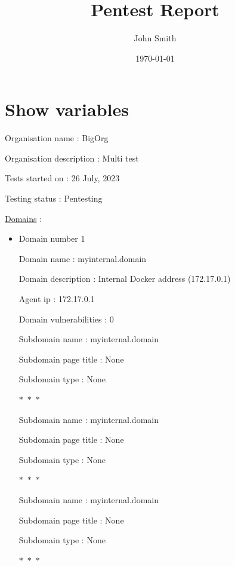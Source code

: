 \documentclass[a4paper,11pt]{book}
\title{Pentest Report} %
\author{John Smith} %
\date{\today} %
\begin{document}
 
\maketitle %

\section{Show variables}

Organisation name : BigOrg

Organisation description : Multi test

Tests started on : 26 July, 2023\

Testing status : Pentesting

\underline{Domains} :

\begin{itemize}
    \item Domain number 1

    Domain name : myinternal.domain

    Domain description : Internal Docker address (172.17.0.1)
    
        Agent ip : 172.17.0.1

    Domain vulnerabilities : 0
    


        Subdomain name : myinternal.domain

        Subdomain page title : None

        Subdomain type : None

        \begin{center}
            $\ast$~$\ast$~$\ast$
        \end{center}

        Subdomain name : myinternal.domain

        Subdomain page title : None

        Subdomain type : None

        \begin{center}
            $\ast$~$\ast$~$\ast$
        \end{center}

        Subdomain name : myinternal.domain

        Subdomain page title : None

        Subdomain type : None

        \begin{center}
            $\ast$~$\ast$~$\ast$
        \end{center}


\end{itemize}
\end{document}
